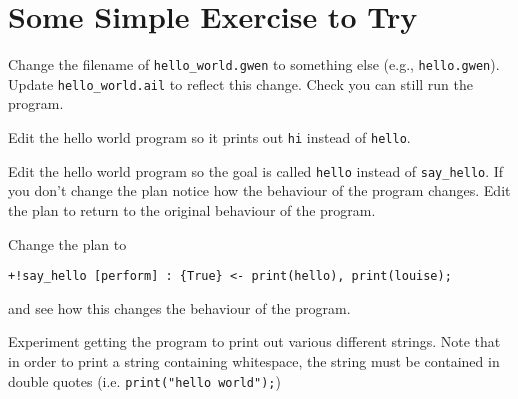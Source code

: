 \section{Some Simple Exercise to Try}
\begin{enumerate}
\begin{sloppypar}
\item Change the filename of \texttt{hello\_world.gwen} to something
  else (e.g., \texttt{hello.gwen}).  Update \texttt{hello\_world.ail}
  to reflect this change.  Check you can still run the program.
\item Edit the hello world program so it prints out \texttt{hi} instead of \texttt{hello}.
\item Edit the hello world program so the goal is called
  \texttt{hello} instead of \texttt{say\_hello}.  If you don't change
  the plan notice how the behaviour of the program changes.  Edit the
  plan to return to the original behaviour of the program.
\end{sloppypar}
\item Change the plan to
\begin{verbatim}
+!say_hello [perform] : {True} <- print(hello), print(louise);
\end{verbatim} and see how this changes the behaviour of the program.
\item Experiment getting the program to print out various different
  strings.  Note that in order to print a string containing whitespace,
  the string must be contained in double quotes
  (i.e. \lstinline{print("hello world");})
\end{enumerate}

